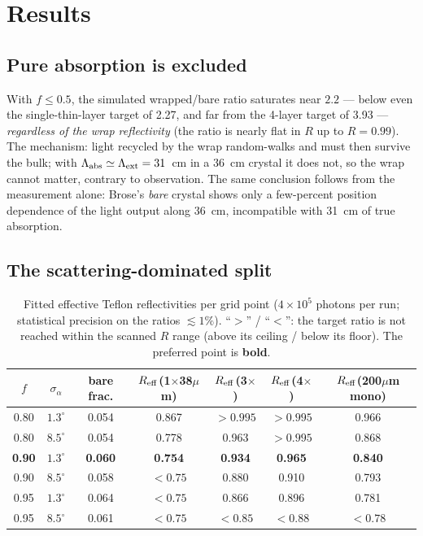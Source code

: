 \documentclass[11pt,a4paper]{article}
\newcommand{\lext}{\Lambda_{\rm ext}}
\newcommand{\labs}{\Lambda_{\rm abs}}
\newcommand{\sa}{\sigma_\alpha}
\begin{document}
\section{Results}
\label{sec:results}

\subsection{Pure absorption is excluded}

With $f \le 0.5$, the simulated wrapped/bare ratio saturates near $2.2$ --- below even
the single-thin-layer target of 2.27, and far from the 4-layer target of 3.93 ---
\emph{regardless of the wrap reflectivity} (the ratio is nearly flat in $R$ up to
$R = 0.99$). The mechanism: light recycled by the wrap random-walks and must then
survive the bulk; with $\labs \simeq \lext = 31$~cm in a 36~cm crystal it does not, so
the wrap cannot matter, contrary to observation. The same conclusion follows from the
measurement alone: Brose's \emph{bare} crystal shows only a few-percent position
dependence of the light output along 36~cm, incompatible with 31~cm of true absorption.

\subsection{The scattering-dominated split}

\begin{table}[htb]
  \centering
  \caption{Fitted effective Teflon reflectivities per grid point
  ($4\times10^5$ photons per run; statistical precision on the ratios
  $\lesssim 1\%$). ``$>$'' / ``$<$'': the target ratio is not reached within the
  scanned $R$ range (above its ceiling / below its floor). The preferred point is
  \textbf{bold}.}
  \label{tab:grid}
  \begin{tabular}{ccccccc}
    \toprule
    $f$ & $\sa$ & bare frac. & $R_{\rm eff}$(1$\times$38$\mu$m) &
    $R_{\rm eff}$(3$\times$) & $R_{\rm eff}$(4$\times$) & $R_{\rm eff}$(200$\mu$m mono) \\
    \midrule
    0.80 & $1.3^\circ$ & 0.054 & 0.867 & $>0.995$ & $>0.995$ & 0.966 \\
    0.80 & $8.5^\circ$ & 0.054 & 0.778 & 0.963    & $>0.995$ & 0.868 \\
    \textbf{0.90} & $\mathbf{1.3^\circ}$ & \textbf{0.060} & \textbf{0.754} &
      \textbf{0.934} & \textbf{0.965} & \textbf{0.840} \\
    0.90 & $8.5^\circ$ & 0.058 & $<0.75$ & 0.880 & 0.910 & 0.793 \\
    0.95 & $1.3^\circ$ & 0.064 & $<0.75$ & 0.866 & 0.896 & 0.781 \\
    0.95 & $8.5^\circ$ & 0.061 & $<0.75$ & $<0.85$ & $<0.88$ & $<0.78$ \\
    \bottomrule
  \end{tabular}
\end{table}
\end{document}
